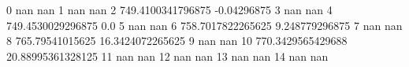 0 nan nan
1 nan nan
2 749.4100341796875 -0.04296875
3 nan nan
4 749.4530029296875 0.0
5 nan nan
6 758.7017822265625 9.248779296875
7 nan nan
8 765.79541015625 16.3424072265625
9 nan nan
10 770.3429565429688 20.88995361328125
11 nan nan
12 nan nan
13 nan nan
14 nan nan
